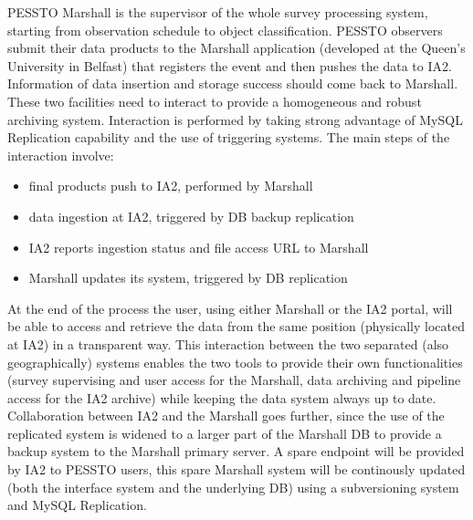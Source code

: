 PESSTO Marshall is the supervisor of the whole survey processing system, starting from observation schedule to object classification. PESSTO observers submit their data products to the Marshall application (developed at the Queen's University in Belfast) that registers the event and then pushes the data to IA2. Information of data insertion and storage success should come back to Marshall. These two facilities need to interact to provide a homogeneous and robust archiving system. Interaction is performed by taking strong advantage of MySQL Replication capability and the use of triggering systems. The main steps of the interaction involve:
\begin{itemize}[noitemsep,nolistsep]
	\item final products push to IA2, performed by Marshall
	\item data ingestion at IA2, triggered by DB backup replication
	\item {}IA2 reports ingestion status and file access URL to Marshall
	\item Marshall updates its system, triggered by DB replication
\end{itemize} 
At the end of the process the user, using either Marshall or the IA2 portal, will be able to access and retrieve the data from the same position (physically located at IA2) in a transparent way. This interaction between the two separated (also geographically) systems enables the two tools to provide their own functionalities (survey supervising and user access for the Marshall, data archiving and pipeline access for the IA2 archive) while keeping the data system always up to date. Collaboration between IA2 and the Marshall goes further, since the use of the replicated system is widened to a larger part of the Marshall DB to provide a backup system to the Marshall primary server. A spare endpoint will be provided by IA2 to PESSTO users, this spare Marshall system will be continously updated (both the interface system and the underlying DB) using a subversioning system and MySQL Replication.

